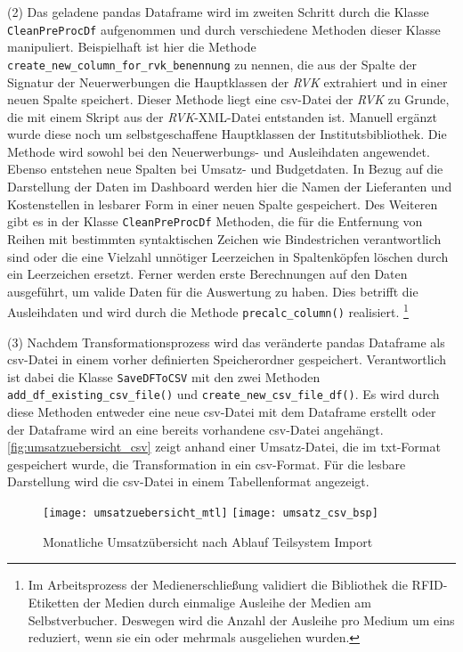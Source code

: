     (2) Das geladene pandas Dataframe wird im zweiten Schritt durch die Klasse \texttt{CleanPreProcDf} aufgenommen und durch verschiedene Methoden dieser Klasse
    manipuliert. Beispielhaft ist hier die Methode \texttt{create\_new\_column\_for\_rvk\_benennung} zu nennen, die aus der Spalte der Signatur 
    der Neuerwerbungen die Hauptklassen der \textit{\acrlong{RVK}} extrahiert und in einer neuen Spalte speichert. Dieser Methode liegt eine csv-Datei
    der \textit{\acrshort{RVK}} zu Grunde, die mit einem Skript aus der \textit{\acrshort{RVK}}-XML-Datei entstanden ist. Manuell ergänzt wurde diese 
    noch um selbstgeschaffene Hauptklassen der Institutsbibliothek. Die Methode wird sowohl bei den Neuerwerbungs- und Ausleihdaten angewendet.
    Ebenso entstehen neue Spalten bei Umsatz- und Budgetdaten. In Bezug auf die Darstellung der Daten im Dashboard werden
    hier die Namen der Lieferanten und Kostenstellen in lesbarer Form in einer neuen Spalte gespeichert. 
    Des Weiteren gibt es in der Klasse \texttt{CleanPreProcDf} Methoden, die für die Entfernung von Reihen mit bestimmten syntaktischen Zeichen wie Bindestrichen 
    verantwortlich sind oder die eine Vielzahl unnötiger Leerzeichen in Spaltenköpfen löschen durch ein Leerzeichen ersetzt.
    Ferner werden erste Berechnungen auf den Daten ausgeführt, um valide Daten für die Auswertung zu haben. Dies betrifft die Ausleihdaten und wird durch die
    Methode \texttt{precalc\_column()} realisiert.
    \footnote{Im Arbeitsprozess der Medienerschließung validiert die Bibliothek die RFID-Etiketten der Medien durch einmalige Ausleihe der Medien am Selbstverbucher.
    Deswegen wird die Anzahl der Ausleihe pro Medium um eins reduziert, wenn sie ein oder mehrmals ausgeliehen wurden.}
     
    (3) Nachdem Transformationsprozess wird das veränderte pandas Dataframe als csv-Datei in einem vorher definierten Speicherordner gespeichert. 
    Verantwortlich ist dabei die Klasse \texttt{SaveDFToCSV} mit den zwei Methoden \texttt{add\_df\_existing\_csv\_file()} und 
    \texttt{create\_new\_csv\_file\_df()}. 
    Es wird durch diese Methoden entweder eine neue csv-Datei mit dem Dataframe erstellt oder der Dataframe wird an eine bereits vorhandene csv-Datei angehängt.
    \autoref{fig:umsatzuebersicht_csv} zeigt anhand einer Umsatz-Datei, die im txt-Format gespeichert wurde, die Transformation
    in ein csv-Format. Für die lesbare Darstellung wird die csv-Datei in einem Tabellenformat angezeigt.

    \begin{figure}[h]
        \centering
            \texttt{[image: umsatzuebersicht\_mtl]}
            \texttt{[image: umsatz\_csv\_bsp]}
            \caption{Monatliche Umsatzübersicht nach Ablauf Teilsystem Import}
            \label{fig:umsatzuebersicht_csv}
    \end{figure}


